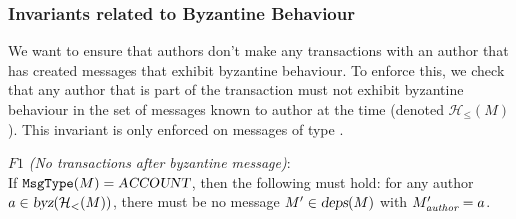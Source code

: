 \documentclass{article}
\begin{document}

\subsubsection{Invariants related to Byzantine Behaviour}
\label{sec:invariants-byz}
We want to ensure that authors don't make any transactions with an author that has created messages that exhibit byzantine behaviour. To enforce this, we check that any author that is part of the transaction must not exhibit byzantine behaviour in the set of messages known to author at the time (denoted $\mathcal H_\leq(M)$). This invariant is only enforced on messages of type .
\begin{invariant}{$F1$}
    \emph{(No transactions after byzantine message)}:\\
    If $\texttt{MsgType}(M) = \textsl{ACCOUNT}$, then the following must hold: for any author $a \in \textsl{byz}(\mathcal H_<(M))$, there must be no message $M' \in \textsl{deps}(M)$ with $M'_\emph{author} = a$.
\end{invariant}
\end{document}
